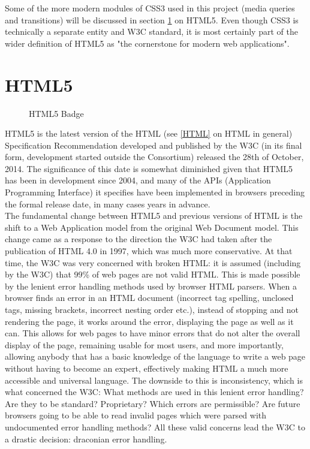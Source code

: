 Some of the more modern modules of CSS3 used in this project (media queries and transitions) will be discussed in section
\ref{HTML5} on HTML5. Even though CSS3 is technically a separate entity and W3C standard, it is most certainly part of the
wider definition of HTML5 as "the cornerstone for modern web applications"\cite{w3c11}.
\section{HTML5} \label{HTML5}
\begin{figure}[h]
\centering

\caption{HTML5 Badge}
\end{figure}
HTML5 is the latest version of the HTML (see \ref{HTML} on HTML in general) Specification Recommendation developed and
published by the W3C (in its final form, development started outside the Consortium) released the 28th of October, 2014.
The significance of this date is somewhat diminished given that HTML5 has been in development since 2004, and many of the
APIs (Application Programming Interface) it specifies have been implemented in browsers preceding the formal release date,
in many cases years in advance.\\

The fundamental change between HTML5 and previous versions of HTML is the shift to a Web Application model from the
original Web Document model. This change came as a response to the direction the W3C had taken after the publication of
HTML 4.0 in 1997, which was much more conservative. At that time, the W3C was very concerned with broken HTML: it is
assumed (including by the W3C\cite{w3cwebquality02}) that 99\% of web pages are not valid HTML. This is made possible by
the lenient error handling methods used by browser HTML parsers. When a browser finds an error in an HTML document 
(incorrect tag spelling, unclosed tags, missing brackets, incorrect nesting order etc.), instead of stopping and not 
rendering the page, it works around the error, displaying the page as well as it can. This allows for web pages to have 
minor errors that do not alter the overall display of the page, remaining usable for most users, and more importantly, 
allowing anybody that has a basic knowledge of the language to write a web page without having to become an expert, 
effectively making HTML a much more accessible and universal language. The downside to this is inconsistency, which is 
what concerned the W3C: What methods are used in this lenient error handling? Are they to be standard? Proprietary? Which 
errors are permissible? Are future browsers going to be able to read invalid pages which were parsed with undocumented 
error handling methods? All these valid concerns lead the W3C to a drastic decision: draconian error handling.\\


